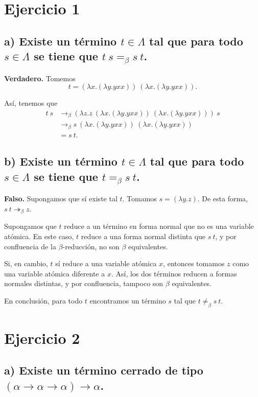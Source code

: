 \documentclass{article}
\begin{document}
\section*{Ejercicio 1}
\subsection*{a) Existe un término $t \in \Lambda$ tal que para todo $s \in \Lambda$ se tiene que $t\ s =_\beta s\ t$.}

\textbf{Verdadero.} Tomemos \[
    t = (\lambda x. (\lambda y. y x x))\ (\lambda x. (\lambda y. y x x)).
\]

Así, tenemos que 
\begin{align*}
    t\ s &\rightarrow_\beta (\lambda z. z\ (\lambda x. (\lambda y. y x x))\ (\lambda x. (\lambda y. y x x)))\ s\\
    &\rightarrow_\beta s\ (\lambda x. (\lambda y. y x x))\ (\lambda x. (\lambda y. y x x))\\
    &= s\ t.
\end{align*}

\subsection*{b) Existe un término $t \in \Lambda$ tal que para todo $s \in \Lambda$ se tiene que $t =_\beta s\ t$.}


\textbf{Falso.} Supongamos que sí existe tal $t$. Tomamos $s = (\lambda y. z)$. De esta forma, $s\ t \twoheadrightarrow_\beta z$.

Supongamos que $t$ reduce a un término en forma normal que no es una variable atómica. En este caso, $t$ reduce a una forma normal distinta que $s\ t$, y por confluencia de la $\beta$-reducción, no son $\beta$ equivalentes.

Si, en cambio, $t$ sí reduce a una variable atómica $x$, entonces tomamos $z$ como una variable atómica diferente a $x$. Así, los dos términos reducen a formas normales distintas, y por confluencia, tampoco son $\beta$ equivalentes.

En conclusión, para todo $t$ encontramos un término $s$ tal que $t \neq_\beta s\ t$.

\section*{Ejercicio 2}
\subsection*{a) Existe un término cerrado de tipo $(\alpha \rightarrow \alpha \rightarrow \alpha) \rightarrow \alpha$.}
\end{document}
